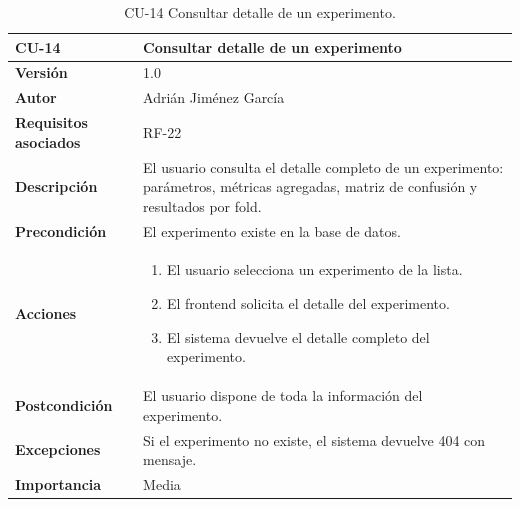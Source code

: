 \begin{table}[p]
	\centering
	\begin{tabularx}{\linewidth}{ p{} X }
		\toprule
		\textbf{CU-14}    & \textbf{Consultar detalle de un experimento}\\
		\toprule
		\textbf{Versión}              & 1.0 \\
		\textbf{Autor}                & Adrián Jiménez García \\
		\textbf{Requisitos asociados} & RF-22 \\
		\textbf{Descripción}          & El usuario consulta el detalle completo de un experimento: parámetros, métricas agregadas, matriz de confusión y resultados por fold. \\
		\textbf{Precondición}         & El experimento existe en la base de datos. \\
		\textbf{Acciones}             &
		\begin{enumerate}
			\def\labelenumi{\arabic{enumi}.}
			\tightlist
			\item El usuario selecciona un experimento de la lista.
			\item El frontend solicita el detalle del experimento.
			\item El sistema devuelve el detalle completo del experimento.
		\end{enumerate}\\
		\textbf{Postcondición}        & El usuario dispone de toda la información del experimento. \\
		\textbf{Excepciones}          & Si el experimento no existe, el sistema devuelve 404 con mensaje. \\
		\textbf{Importancia}          & Media \\
		\bottomrule
	\end{tabularx}
	\caption{CU-14 Consultar detalle de un experimento.}
\end{table}

